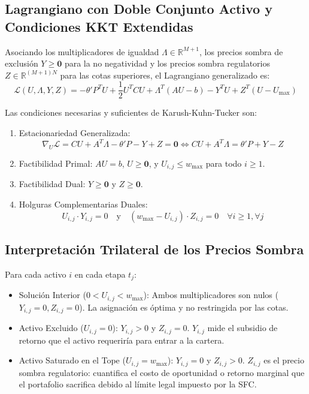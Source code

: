 \documentclass[11pt,a4paper]{article}
\begin{document}
\subsection{Lagrangiano con Doble Conjunto Activo y Condiciones KKT Extendidas}
Asociando los multiplicadores de igualdad $\Lambda \in \mathbb{R}^{M+1}$, los precios sombra de exclusión $Y \ge \mathbf{0}$ para la no negatividad y los precios sombra regulatorios $Z \in \mathbb{R}^{(M+1)N}$ para las cotas superiores, el Lagrangiano generalizado es:
\begin{equation}
    \mathcal{L}(U, \Lambda, Y, Z) = -\theta' P^T U + \frac{1}{2} U^T C U + \Lambda^T (AU - b) - Y^T U + Z^T (U - U_{\max})
\end{equation}

Las condiciones necesarias y suficientes de Karush-Kuhn-Tucker son:
\begin{enumerate}
    \item Estacionariedad Generalizada:
    \begin{equation}
        \nabla_U \mathcal{L} = CU + A^T \Lambda - \theta' P - Y + Z = \mathbf{0} \iff CU + A^T \Lambda = \theta' P + Y - Z
    \end{equation}
    \item Factibilidad Primal: $AU = b$, $U \ge \mathbf{0}$, y $U_{i,j} \le w_{\max}$ para todo $i \ge 1$.
    \item Factibilidad Dual: $Y \ge \mathbf{0}$ y $Z \ge \mathbf{0}$.
    \item Holguras Complementarias Duales:
    \begin{equation}
        U_{i,j} \cdot Y_{i,j} = 0 \quad \text{y} \quad (w_{\max} - U_{i,j}) \cdot Z_{i,j} = 0 \quad \forall i \ge 1, \forall j
    \end{equation}
\end{enumerate}

\subsection{Interpretación Trilateral de los Precios Sombra}
Para cada activo $i$ en cada etapa $t_j$:
\begin{itemize}
    \item Solución Interior ($0 < U_{i,j} < w_{\max}$): Ambos multiplicadores son nulos ($Y_{i,j} = 0, Z_{i,j} = 0$). La asignación es óptima y no restringida por las cotas.
    \item Activo Excluido ($U_{i,j} = 0$): $Y_{i,j} > 0$ y $Z_{i,j} = 0$. $Y_{i,j}$ mide el subsidio de retorno que el activo requeriría para entrar a la cartera.
    \item Activo Saturado en el Tope ($U_{i,j} = w_{\max}$): $Y_{i,j} = 0$ y $Z_{i,j} > 0$. $Z_{i,j}$ es el precio sombra regulatorio: cuantifica el costo de oportunidad o retorno marginal que el portafolio sacrifica debido al límite legal impuesto por la SFC.
\end{itemize}
\end{document}
